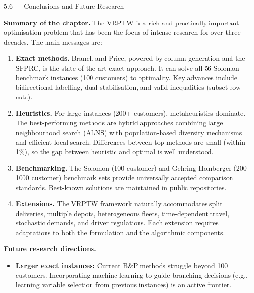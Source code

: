 \documentclass[aspectratio=169,10pt]{beamer}
\begin{document}
\begin{frame}[allowframebreaks]{5.6 --- Conclusions and Future Research}

\textbf{Summary of the chapter.}  The VRPTW is a rich and practically important
optimisation problem that has been the focus of intense research for over three
decades.  The main messages are:

\begin{enumerate}
  \item \textbf{Exact methods.}  Branch-and-Price, powered by column generation
    and the SPPRC, is the state-of-the-art exact approach.  It can solve all 56
    Solomon benchmark instances (100 customers) to optimality.  Key advances
    include bidirectional labelling, dual stabilisation, and valid inequalities
    (subset-row cuts).

  \item \textbf{Heuristics.}  For large instances (200+ customers), metaheuristics
    dominate.  The best-performing methods are hybrid approaches combining large
    neighbourhood search (ALNS) with population-based diversity mechanisms and
    efficient local search.  Differences between top methods are small (within 1\%),
    so the gap between heuristic and optimal is well understood.

  \item \textbf{Benchmarking.}  The Solomon (100-customer) and Gehring-Homberger
    (200--1000 customer) benchmark sets provide universally accepted comparison
    standards.  Best-known solutions are maintained in public repositories.

  \item \textbf{Extensions.}  The VRPTW framework naturally accommodates split
    deliveries, multiple depots, heterogeneous fleets, time-dependent travel,
    stochastic demands, and driver regulations.  Each extension requires adaptations
    to both the formulation and the algorithmic components.
\end{enumerate}

\framebreak

\textbf{Future research directions.}

\begin{itemize}
  \item \textbf{Larger exact instances:}  Current B\&P methods struggle beyond 100
    customers.  Incorporating machine learning to guide branching decisions (e.g.,
    learning variable selection from previous instances) is an active frontier.


\end{itemize}
\end{frame}
\end{document}
